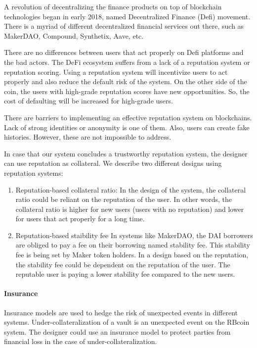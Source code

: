 \documentclass[runningheads]{llncs}
\begin{document}
A revolution of decentralizing the finance products on top of blockchain technologies began in early 2018, named Decentralized Finance (Defi) movement. There is a myriad of different decentralized financial services out there, such as MakerDAO, Compound, Synthetix, Aave, etc. 

There are no differences between users that act properly on Defi platforms and the bad actors. The DeFi ecosystem suffers from a lack of a reputation system or reputation scoring. Using a reputation system will incentivize users to act properly and also reduce the default risk of the system. On the other side of the coin, the users with high-grade reputation scores have new opportunities. So, the cost of defaulting will be increased for high-grade users.

There are barriers to implementing an effective reputation system on blockchains. Lack of strong identities or anonymity is one of them. Also, users can create fake histories. However, these are not impossible to address.

In case that our system concludes a trustworthy reputation system, the designer can use reputation as collateral.  We describe two different designs using reputation systems:
\begin{enumerate}
	\item Reputation-based collateral ratio: 
In the design of the system, the collateral ratio could be reliant on the reputation of the user. In other words, the collateral ratio is higher for new users (users with no reputation) and lower for users that act properly for a long time.
	\item Reputation-based staibility fee
In systems like MakerDAO, the DAI borrowers are obliged to pay a fee on their borrowing named stability fee. This stability fee is being set by Maker token holders.
	In a design based on the reputation, the stability fee could be dependent on the reputation of the user. The reputable user is paying a lower stability fee compared to the new users.
\end{enumerate}
 
\paragraph{Insurance}
Insurance models are used to hedge the risk of unexpected events in different systems. Under-collateralization of a vault is an unexpected event on the RBcoin system. The designer could use an insurance model to protect parties from financial loss in the case of under-collateralization. 
\end{document}
